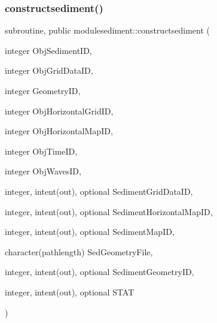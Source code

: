 \subsubsection{\texorpdfstring{constructsediment()}{constructsediment()}}
{\footnotesize\ttfamily subroutine, public modulesediment\+::constructsediment (\begin{DoxyParamCaption}\item[{integer}]{Obj\+Sediment\+ID,  }\item[{integer}]{Obj\+Grid\+Data\+ID,  }\item[{integer}]{Geometry\+ID,  }\item[{integer}]{Obj\+Horizontal\+Grid\+ID,  }\item[{integer}]{Obj\+Horizontal\+Map\+ID,  }\item[{integer}]{Obj\+Time\+ID,  }\item[{integer}]{Obj\+Waves\+ID,  }\item[{integer, intent(out), optional}]{Sediment\+Grid\+Data\+ID,  }\item[{integer, intent(out), optional}]{Sediment\+Horizontal\+Map\+ID,  }\item[{integer, intent(out), optional}]{Sediment\+Map\+ID,  }\item[{character(pathlength)}]{Sed\+Geometry\+File,  }\item[{integer, intent(out), optional}]{Sediment\+Geometry\+ID,  }\item[{integer, intent(out), optional}]{S\+T\+AT }\end{DoxyParamCaption})}

